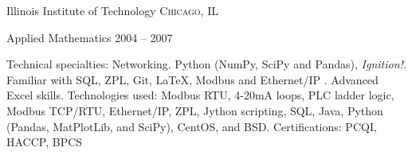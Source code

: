 \documentclass[10pt,a4paper]{article} %
\begin{document}

\spacedhrule{-0.2em}{-0.4em} %



\headedsection %
{Illinois Institute of Technology}
{\textsc{Chicago, IL}} {

\headedsubsection %
{Applied Mathematics}
{2004 -- 2007}
{}}

\spacedhrule{0.5em}{-0.4em} %



\inlineheadsection %
{Technical specialties:}
{Networking. Python (NumPy, SciPy and Pandas), \textit{Ignition!}.  Familiar with SQL, ZPL, Git, \LaTeX, Modbus and Ethernet/IP . Advanced Excel skills.
Technologies used:  Modbus RTU, 4-20mA loops, PLC ladder logic, Modbus TCP/RTU, Ethernet/IP, ZPL, Jython scripting, SQL, Java, Python (Pandas, MatPlotLib, and SciPy), CentOS, and BSD. }
\inlineheadsection
{Certifications:}
{PCQI, HACCP, BPCS}




\spacedhrule{1.6em}{-0.4em} %
\end{document}
